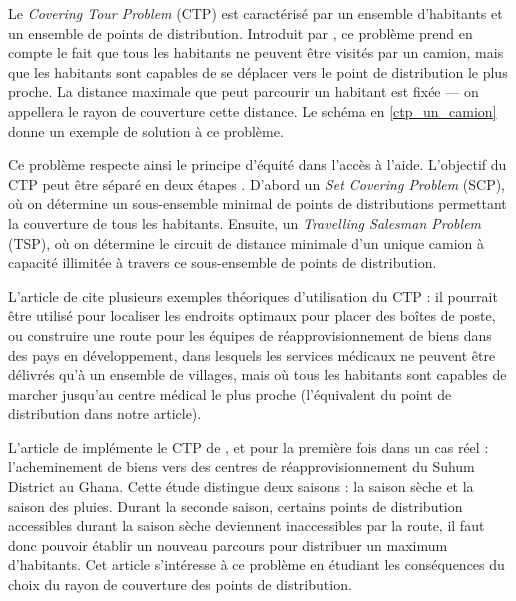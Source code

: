 \documentclass[5p,authoryear]{elsarticle}
\begin{document}
Le \emph{Covering Tour Problem} (CTP) est caractérisé par un ensemble d'habitants et un ensemble de points de distribution. Introduit par \cite{gendreau_covering_1997}, ce problème prend en compte le fait que tous les habitants ne peuvent être visités par un camion, mais que les habitants sont capables de se déplacer vers le point de distribution le plus proche. La distance maximale que peut parcourir un habitant est fixée — on appellera le rayon de couverture cette distance. Le schéma en \cref{ctp_un_camion} donne un exemple de solution à ce problème.

Ce problème respecte ainsi le principe d'équité dans l'accès à l'aide. L'objectif du CTP peut être séparé en deux étapes \citep{jozefowiez_bi-objective_2007}. D'abord un \emph{Set Covering Problem} (SCP), où on détermine un sous-ensemble minimal de points de distributions permettant la couverture de tous les habitants. Ensuite, un \emph{Travelling Salesman Problem} (TSP), où on détermine le circuit de distance minimale d'un unique camion à capacité illimitée à travers ce sous-ensemble de points de distribution.

L'article de \cite{gendreau_covering_1997} cite plusieurs exemples théoriques d'utilisation du CTP : il pourrait être utilisé pour localiser les endroits optimaux pour placer des boîtes de poste, ou construire une route pour les équipes de réapprovisionnement de biens dans des pays en développement, dans lesquels les services médicaux ne peuvent être délivrés qu’à un ensemble de villages, mais où tous les habitants sont capables de marcher jusqu'au centre médical le plus proche (l'équivalent du point de distribution dans notre article).

L’article de \cite{hodgson_covering_1998} implémente le CTP de \cite{gendreau_covering_1997}, et pour la première fois dans un cas réel : l’acheminement de biens vers des centres de réapprovisionnement du Suhum District au Ghana. Cette étude distingue deux saisons : la saison sèche et la saison des pluies. Durant la seconde saison, certains points de distribution accessibles durant la saison sèche deviennent inaccessibles par la route, il faut donc pouvoir établir un nouveau parcours pour distribuer un maximum d’habitants. Cet article s’intéresse à ce problème en étudiant les conséquences du choix du rayon de couverture des points de distribution.
\end{document}
